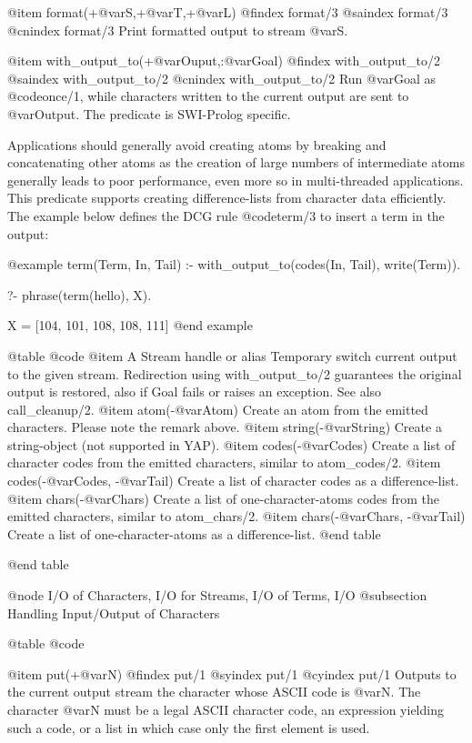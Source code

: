 {{{{{{@item format(+@var{S},+@var{T},+@var{L})
@findex format/3
@saindex format/3
@cnindex format/3
Print formatted output to stream @var{S}.

@item with_output_to(+@var{Ouput},:@var{Goal})
@findex with_output_to/2
@saindex with_output_to/2
@cnindex with_output_to/2
Run @var{Goal} as @code{once/1}, while characters written to the current
output are sent to @var{Output}. The predicate is SWI-Prolog
specific.

Applications should generally avoid creating atoms by breaking and
concatenating other atoms as the creation of large numbers of
intermediate atoms generally leads to poor performance, even more so in
multi-threaded applications. This predicate supports creating
difference-lists from character data efficiently. The example below
defines the DCG rule @code{term/3} to insert a term in the output:

@example
 term(Term, In, Tail) :-
        with_output_to(codes(In, Tail), write(Term)).

?- phrase(term(hello), X).

X = [104, 101, 108, 108, 111]
@end example

@table @code
@item A Stream handle or alias
    Temporary switch current output to the given stream. Redirection using with_output_to/2 guarantees the original output is restored, also if Goal fails or raises an exception. See also call_cleanup/2. 
@item atom(-@var{Atom})
    Create an atom from the emitted characters. Please note the remark above. 
@item string(-@var{String})
    Create a string-object (not supported in YAP). 
@item codes(-@var{Codes})
    Create a list of character codes from the emitted characters, similar to atom_codes/2. 
@item codes(-@var{Codes}, -@var{Tail})
    Create a list of character codes as a difference-list. 
@item chars(-@var{Chars})
    Create a list of one-character-atoms codes from the emitted characters, similar to atom_chars/2. 
@item chars(-@var{Chars}, -@var{Tail})
    Create a list of one-character-atoms as a difference-list. 
@end table

@end table

@node I/O of Characters, I/O for Streams, I/O of Terms, I/O
@subsection Handling Input/Output of Characters

@table @code

@item put(+@var{N})
@findex put/1
@syindex put/1
@cyindex put/1
Outputs to the current output stream the character whose ASCII code is
@var{N}. The character @var{N} must be a legal ASCII character code, an
expression yielding such a code, or a list in which case only the first
element is used.

}}}}}}
